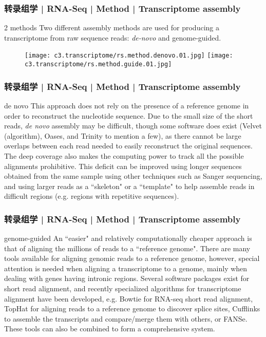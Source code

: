 \begin{frame}
  \frametitle{转录组学 | RNA-Seq | Method | Transcriptome assembly}
  \begin{block}{2 methods}
    Two different assembly methods are used for producing a transcriptome from raw sequence reads: \textit{de-novo} and genome-guided. 
  \end{block}
  \begin{figure}
    \centering
    \texttt{[image: c3.transcriptome/rs.method.denovo.01.jpg]} \quad
    \texttt{[image: c3.transcriptome/rs.method.guide.01.jpg]}
  \end{figure}
\end{frame}

\begin{frame}
  \frametitle{转录组学 | RNA-Seq | Method | Transcriptome assembly}
  \begin{block}{de novo}
    This approach does not rely on the presence of a reference genome in order to reconstruct the nucleotide sequence. Due to the small size of the short reads, \textit{de novo} assembly may be difficult, though some software does exist (Velvet (algorithm), Oases, and Trinity to mention a few), as there cannot be large overlaps between each read needed to easily reconstruct the original sequences. The deep coverage also makes the computing power to track all the possible alignments prohibitive. This deficit can be improved using longer sequences obtained from the same sample using other techniques such as Sanger sequencing, and using larger reads as a ``skeleton" or a ``template" to help assemble reads in difficult regions (e.g. regions with repetitive sequences).
  \end{block}
\end{frame}

\begin{frame}
  \frametitle{转录组学 | RNA-Seq | Method | Transcriptome assembly}
  \begin{block}{genome-guided}
    An ``easier" and relatively computationally cheaper approach is that of aligning the millions of reads to a ``reference genome". There are many tools available for aligning genomic reads to a reference genome, however, special attention is needed when aligning a transcriptome to a genome, mainly when dealing with genes having intronic regions. Several software packages exist for short read alignment, and recently specialized algorithms for transcriptome alignment have been developed, e.g. Bowtie for RNA-seq short read alignment, TopHat for aligning reads to a reference genome to discover splice sites, Cufflinks to assemble the transcripts and compare/merge them with others, or FANSe. These tools can also be combined to form a comprehensive system.
  \end{block}
\end{frame}

